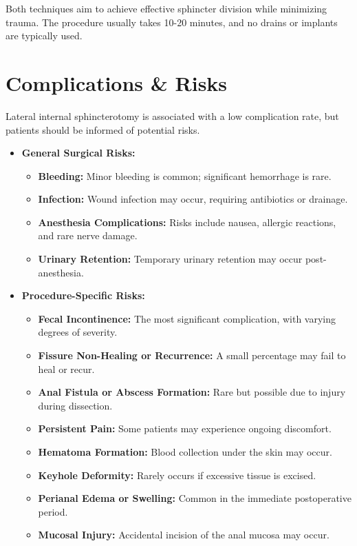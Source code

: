 Both techniques aim to achieve effective sphincter division while minimizing trauma. The procedure usually takes 10-20 minutes, and no drains or implants are typically used.

\section*{Complications \& Risks}
Lateral internal sphincterotomy is associated with a low complication rate, but patients should be informed of potential risks.

\begin{itemize}
  \item \textbf{General Surgical Risks:}
    \begin{itemize}
      \item \textbf{Bleeding:} Minor bleeding is common; significant hemorrhage is rare.
      \item \textbf{Infection:} Wound infection may occur, requiring antibiotics or drainage.
      \item \textbf{Anesthesia Complications:} Risks include nausea, allergic reactions, and rare nerve damage.
      \item \textbf{Urinary Retention:} Temporary urinary retention may occur post-anesthesia.
    \end{itemize}
  \item \textbf{Procedure-Specific Risks:}
    \begin{itemize}
      \item \textbf{Fecal Incontinence:} The most significant complication, with varying degrees of severity.
      \item \textbf{Fissure Non-Healing or Recurrence:} A small percentage may fail to heal or recur.
      \item \textbf{Anal Fistula or Abscess Formation:} Rare but possible due to injury during dissection.
      \item \textbf{Persistent Pain:} Some patients may experience ongoing discomfort.
      \item \textbf{Hematoma Formation:} Blood collection under the skin may occur.
      \item \textbf{Keyhole Deformity:} Rarely occurs if excessive tissue is excised.
      \item \textbf{Perianal Edema or Swelling:} Common in the immediate postoperative period.
      \item \textbf{Mucosal Injury:} Accidental incision of the anal mucosa may occur.
    \end{itemize}
\end{itemize}

